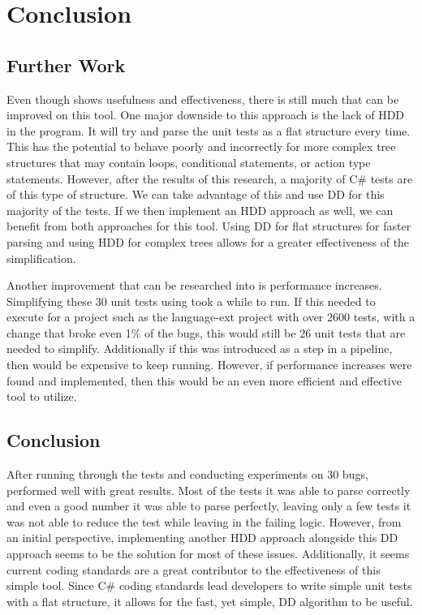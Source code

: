 \clearpage %

\chapter{Conclusion}\label{CH7_Conclusion}

\section{Further Work}

Even though \mytool shows usefulness and effectiveness, there is still much that can be improved on this tool. One major downside to this approach is the lack of HDD in the program. It will try and parse the unit tests as a flat structure every time. This has the potential to behave poorly and incorrectly for more complex tree structures that may contain loops, conditional statements, or action type statements. However, after the results of this research, a majority of C\# tests are of this type of structure. We can take advantage of this and use DD for this majority of the tests. If we then implement an HDD approach as well, we can benefit from both approaches for this tool. Using DD for flat structures for faster parsing and using HDD for complex trees allows for a greater effectiveness of the simplification. 

Another improvement that can be researched into is performance increases. Simplifying these 30 unit tests using \mytool took a while to run. If this needed to execute for a project such as the language-ext project with over 2600 tests, with a change that broke even 1\% of the bugs, this would still be 26 unit tests that are needed to simplify. Additionally if this was introduced as a step in a pipeline, then would be expensive to keep running. However, if performance increases were found and implemented, then this would be an even more efficient and effective tool to utilize.

\section{Conclusion}

 After running through the tests and conducting experiments on 30 bugs, \mytool performed well with great results. Most of the tests it was able to parse correctly and even a good number it was able to parse perfectly, leaving only a few tests it was not able to reduce the test while leaving in the failing logic. However, from an initial perspective, implementing another HDD approach alongside this DD approach seems to be the solution for most of these issues. Additionally, it seems current coding standards are a great contributor to the effectiveness of this simple tool. Since C\# coding standards lead developers to write simple unit tests with a flat structure, it allows for the fast, yet simple, DD algorithm to be useful.
